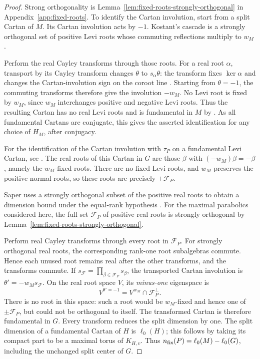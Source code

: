 \documentclass[12pt]{amsart}
\numberwithin{equation}{section}
\theoremstyle{plain}
\theoremstyle{definition}
\theoremstyle{remark}
\begin{document}
\begin{proof}
Strong orthogonality is Lemma~\ref{lem:fixed-roots-strongly-orthogonal} in Appendix~\ref{app:fixed-roots}. To identify the Cartan involution, start from a split Cartan of $M$. Its Cartan involution acts by $-1$. Kostant's cascade is a strongly orthogonal set of positive Levi roots whose commuting reflections multiply to $w_M$ \cite[Prop.~1.10]{KostantCascade2012}.

Perform the real Cayley transforms through those roots. For a real root $\alpha$, transport by its Cayley transform changes $\theta$ to $s_\alpha\theta$: the transform fixes $\ker\alpha$ and changes the Cartan-involution sign on the coroot line \cite[p.~392, (6.67a)--(6.68c)]{Knapp2002}. Starting from $\theta=-1$, the commuting transforms therefore give the involution $-w_M$. No Levi root is fixed by $w_M$, since $w_M$ interchanges positive and negative Levi roots. Thus the resulting Cartan has no real Levi roots and is fundamental in $M$ by \cite[Proposition~6.70]{Knapp2002}. As all fundamental Cartans are conjugate, this gives the asserted identification for any choice of $H_M$, after conjugacy. 

For the identification of the Cartan involution with $\tau_P$ on a fundamental Levi Cartan, see \cite[\S8.5]{SaperMicro}. The real roots of this Cartan in $G$ are those $\beta$ with $(-w_M)\beta=-\beta$, namely the $w_M$-fixed roots. There are no fixed Levi roots, and $w_M$ preserves the positive normal roots, so these roots are precisely $\pm\mathcal F_P$. 

Saper uses a strongly orthogonal subset of the positive real roots to obtain a dimension bound under the equal-rank hypothesis \cite[proof of Lemma~25.2, (25.2.2)]{SaperMicro}. For the maximal parabolics considered here, the full set $\mathcal F_P$ of positive real roots is strongly orthogonal by Lemma~\ref{lem:fixed-roots-strongly-orthogonal}. 

Perform real Cayley transforms through every root in $\mathcal F_P$. For strongly orthogonal real roots, the corresponding rank-one root subalgebras commute. Hence each unused root remains real after the other transforms, and the transforms commute. If $s_{\mathcal F}=\prod_{\beta\in\mathcal F_P}s_\beta$, the transported Cartan involution is $\theta'=-w_M s_{\mathcal F}$. On the real root space $V$, its \emph{minus-one} eigenspace is  
\[
 V^{\theta'=-1}=V^{w_M}\cap\mathcal F_P^\perp.
\]
There is no root in this space: such a root would be $w_M$-fixed and hence one of $\pm\mathcal F_P$, but could not be orthogonal to itself. The transformed Cartan is therefore fundamental in $G$. Every transform reduces the split dimension by one. The split dimension of a fundamental Cartan of $H$ is $\ell_0(H)$; this follows by taking its compact part to be a maximal torus of $K_{H,v}$. Thus $n_{\rm fix}(P)=\ell_0(M)-\ell_0(G)$, including the unchanged split center of $G$.


\end{proof}
\end{document}
